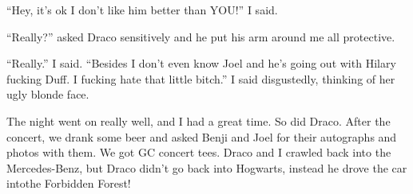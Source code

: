 \enquote{Hey, it's ok I don't like him better than YOU!} I said.

\enquote{Really?} asked Draco sensitively and he put his arm around me all protective.

\enquote{Really.} I said. \enquote{Besides I don't even know Joel and he's going out with Hilary fucking Duff. I fucking hate that little bitch.} I said disgustedly, thinking of her ugly blonde face.

The night went on really well, and I had a great time. So did Draco. After the concert, we drank some beer and asked Benji and Joel for their autographs and photos with them. We got GC concert tees. Draco and I crawled back into the Mercedes-Benz, but Draco didn't go back into Hogwarts, instead he drove the car into\dotfill the Forbidden Forest!
